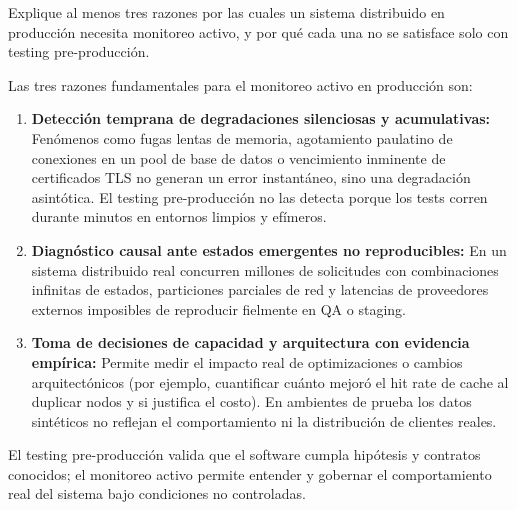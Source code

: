 \documentclass[variant=guia,cover=institutional,mode=screen]{ua-engineering-v6-article}
\begin{document}
\begin{uaexercise}
Explique al menos tres razones por las cuales un sistema distribuido en producción necesita monitoreo activo, y por qué cada una no se satisface solo con testing pre-producción.
\end{uaexercise}
\begin{uaanswer}
Las tres razones fundamentales para el monitoreo activo en producción son:
\begin{enumerate}
\item \textbf{Detección temprana de degradaciones silenciosas y acumulativas:} Fenómenos como fugas lentas de memoria, agotamiento paulatino de conexiones en un pool de base de datos o vencimiento inminente de certificados TLS no generan un error instantáneo, sino una degradación asintótica. El testing pre-producción no las detecta porque los tests corren durante minutos en entornos limpios y efímeros.
\item \textbf{Diagnóstico causal ante estados emergentes no reproducibles:} En un sistema distribuido real concurren millones de solicitudes con combinaciones infinitas de estados, particiones parciales de red y latencias de proveedores externos imposibles de reproducir fielmente en QA o staging.
\item \textbf{Toma de decisiones de capacidad y arquitectura con evidencia empírica:} Permite medir el impacto real de optimizaciones o cambios arquitectónicos (por ejemplo, cuantificar cuánto mejoró el hit rate de cache al duplicar nodos y si justifica el costo). En ambientes de prueba los datos sintéticos no reflejan el comportamiento ni la distribución de clientes reales.
\end{enumerate}
El testing pre-producción valida que el software cumpla hipótesis y contratos conocidos; el monitoreo activo permite entender y gobernar el comportamiento real del sistema bajo condiciones no controladas.
\end{uaanswer}
\end{document}
